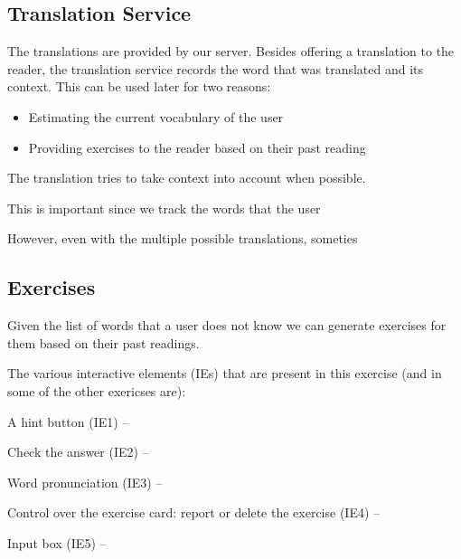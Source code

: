 \subsection {Translation Service}

The translations are provided by our server. Besides offering a translation to the reader, the translation service records the word that was translated and its context. This can be used later for two reasons: 

\begin{itemize}
	\item Estimating the current vocabulary of the user
	\item Providing exercises to the reader based on their past reading
\end{itemize}

The translation tries to take context into account when possible. 


This is important since we track the words that the user 


However, even with the multiple possible translations, someties 


\subsection {Exercises}

Given the list of words that a user does not know we can generate exercises for them based on their past readings.

The various interactive elements (IEs) that are present in this exercise (and in some of the other exericses are): 

\begin{description}
	\item A hint button (IE1) --
	\item Check the answer (IE2) -- 
	\item Word pronunciation (IE3) -- 
	\item Control over the exercise card: report or delete the exercise (IE4) -- 
	\item Input box (IE5) -- 
\end{description}

